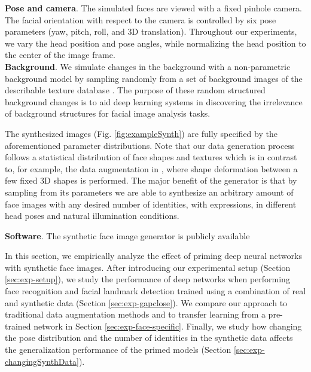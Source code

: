 \documentclass[10pt,twocolumn,letterpaper]{article}
\begin{document}
	\textbf{Pose and camera}. The simulated faces are viewed with a fixed pinhole camera. The facial orientation with respect to the camera is controlled by six pose parameters (yaw, pitch, roll, and 3D translation). Throughout our experiments, we vary the head position and pose angles, while normalizing the head position to the center of the image frame.\\
	
	\textbf{Background}. We simulate changes in the background with a non-parametric background model by sampling randomly from a set of background images of the describable texture database \cite{textures}. The purpose of these random structured background changes is to aid deep learning systems in discovering the irrelevance of background structures for facial image analysis tasks.

	
	The synthesized images (Fig. \ref{fig:exampleSynth}) are fully specified by the aforementioned parameter distributions. Note that our data generation process follows a statistical distribution of face shapes and textures which is in contrast to, for example, the data augmentation in \cite{masi2016we}, where shape deformation between a few fixed 3D shapes is performed. The major benefit of the generator is that by sampling from its parameters we are able to synthesize an arbitrary amount of face images with any desired number of identities, with expressions, in different head poses and natural illumination conditions.
	
    \textbf{Software}. The synthetic face image generator is publicly available


    In this section, we empirically analyze the effect of priming deep neural networks with synthetic face images. After introducing our experimental setup (Section \ref{sec:exp-setup}), we study the performance of deep networks when performing face recognition and facial landmark detection trained using a combination of real and synthetic data (Section \ref{sec:exp-gapclose}). We compare our approach to traditional data augmentation methods and to transfer learning from a pre-trained network in Section \ref{sec:exp-face-specific}. Finally, we study how changing the pose distribution and the number of identities in the synthetic data affects the generalization performance of the primed models (Section \ref{sec:exp-changingSynthData}). 
\end{document}
